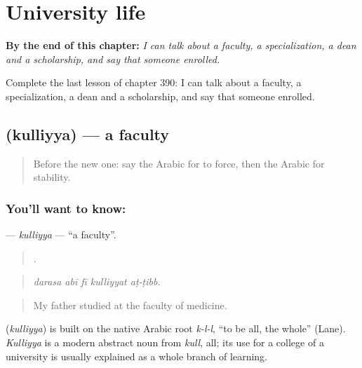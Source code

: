 
\chapter{University life}
\label{ch:ar-university-life}

\begin{chapteropening}
\textbf{By the end of this chapter:} \emph{I can talk about a faculty, a specialization, a dean and a scholarship, and say that someone enrolled.}

Complete the last lesson of chapter 390: I can talk about a faculty, a specialization, a dean and a scholarship, and say that someone enrolled.
\end{chapteropening}

\section[\texorpdfstring{\ar{كلية} (kulliyya)}{كلية (kulliyya)}]{ (kulliyya) — a faculty}

\label{lesson:AR-C390-kulliyya}



\begin{quote}
Before the new one: say the Arabic for to force, then the Arabic for stability.
\end{quote}

\subsection*{You'll want to know: }
\textbf{} — \emph{kulliyya} — \textquotedblleft{}a faculty\textquotedblright{}.

\begin{quote}
    .
\end{quote}

\begin{quote}
\emph{darasa abī fī kulliyyat aṭ-ṭibb.}
\end{quote}

\begin{quote}
My father studied at the faculty of medicine.
\end{quote}

\begin{cousinweb}
\textbf{} (\emph{kulliyya}) is built on the native Arabic root \emph{k-l-l}, \textquotedblleft{}to be all, the whole\textquotedblright{} (Lane). \emph{Kulliyya} is a modern abstract noun from \emph{kull}, all; its use for a college of a university is usually explained as a whole branch of learning.
\end{cousinweb}

